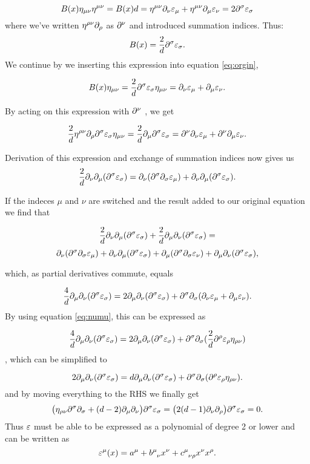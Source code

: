 $$
B(x)\eta_{\mu \nu} \eta^{\mu \nu}=B(x)d= \eta^{\mu \nu}\partial_\nu \varepsilon _\mu+\eta^{\mu \nu}\partial_\mu \varepsilon _\nu=2 \partial^\sigma \varepsilon _\sigma
$$
where we've written $\eta^{\rho \nu}\partial_\rho $ as $\partial^\nu $ and introduced summation indices. Thus:
\begin{equation}
B(x)=\frac{2}{d} \partial^\sigma \varepsilon _\sigma.
\label{eq:B(x)}
\end{equation}
We continue by we inserting this expression into equation \ref{eq:orgin}, 

\begin{equation}
B(x) \eta_{\mu \nu}= \frac{2}{d} \partial^\sigma \varepsilon _\sigma \eta_{\mu \nu}
=\partial_\nu \varepsilon _\mu
+\partial_\mu \varepsilon _\nu.
\label{eq:numu}
\end{equation}

By acting on this expression with $\partial^\nu $ , we get

$$
\frac{ 2}{d}\eta^{\rho\nu}\partial_\rho \partial^\sigma \varepsilon _\sigma \eta_{\mu \nu}
=
\frac{ 2}{d} \partial_\mu \partial^\sigma \varepsilon_\sigma
=
\partial^\nu \partial_\nu \varepsilon _\mu
+\partial^\nu \partial_\mu \varepsilon _\nu.
$$


Derivation of this expression and exchange of summation indices now gives us
$$
\frac{2}{d} \partial_\nu \partial_\mu(\partial^\sigma \varepsilon_\sigma)
=\partial_\nu(\partial^\sigma \partial_\sigma\varepsilon_\mu)
+\partial_\nu \partial_\mu(\partial^\sigma \varepsilon_\sigma).
$$


If the indeces $\mu$ and $\nu$ are switched and the result added to our original equation we find that

$$
\frac{2}{d}\partial_\nu \partial_\mu(\partial^\sigma \varepsilon_\sigma)+\frac{2}{d}\partial_\mu \partial_\nu(\partial^\sigma \varepsilon_\sigma)=
$$$$
\partial_\nu(\partial^\sigma \partial_\sigma\varepsilon_\mu )
+\partial_\nu \partial_\mu(\partial^\sigma \varepsilon_\sigma)
+\partial_\mu(\partial^\sigma \partial_\sigma\varepsilon_\nu )
+\partial_\mu \partial_\nu(\partial^\sigma \varepsilon_\sigma),
$$

which, as partial derivatives commute, equals

$$
\frac{4}{d}\partial_\mu \partial_\nu(\partial^\sigma \varepsilon_\sigma)
=2\partial_\mu \partial_\nu(\partial^\sigma \varepsilon_\sigma)
+\partial^\sigma \partial_\sigma(\partial_\nu \varepsilon_\mu+\partial_\mu \varepsilon_\nu).
$$
By using equation \ref{eq:numu}, this can be expressed as

$$
\frac{4}{d}\partial_\mu \partial_\nu(\partial^\sigma \varepsilon_\sigma)
=2\partial_\mu \partial_\nu(\partial^\sigma \varepsilon_\sigma)
+\partial^\sigma \partial_\sigma(\frac{2}{d} \partial^\rho \varepsilon _\rho \eta_{\rho \nu})$$
, which can be simplified to

$$
2\partial_\mu \partial_\nu(\partial^\sigma \varepsilon_\sigma)=
d\partial_\mu \partial_\nu(\partial^\sigma \varepsilon_\sigma)
+\partial^\sigma \partial_\sigma ( \partial^\rho \varepsilon _\rho \eta_{\rho \nu}).
$$
and by moving everything to the RHS we finally get
$$
\big(\eta_{\rho \nu}\partial^\sigma \partial_\sigma+(d-2)\partial_\mu \partial_\nu\big)\partial^\sigma \varepsilon_\sigma=
 \big(2(d-1)\partial_\nu \partial_\rho\big)\partial^\sigma \varepsilon_\sigma=0.
$$
Thus $\varepsilon$ must be able to be expressed as a polynomial of degree 2 or lower and can be written as
\begin{equation}
 \ep^\mu(x)=a^\mu +b\ein{\mu}{\nu} x^\nu+ c\ein{\mu}{\nu \rho} x^\nu x^\rho.
 \label{eq:eps}
 \end{equation}
 
